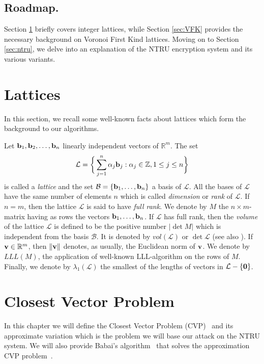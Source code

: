 \documentclass{amsart}
\numberwithin{equation}{section}
\begin{document}
\subsection{Roadmap.}
Section  \ref{sec:lattices} briefly covers integer lattices, while Section \ref{sec:VFK}  provides the necessary background on Voronoi First Kind lattices. Moving on to Section \ref{sec:ntru}, we delve into an explanation of the NTRU encryption system and its various variants.

\section{Lattices}\label{sec:lattices}

In this section, we recall some well-known facts about lattices which form the 
background to our algorithms.

Let ${{\bf{b}}_1,{\bf{b}}_2,\ldots,{\bf{b}}_n}$ linearly independent vectors of 
${\mathbb{R}}^{m}$.
The set 
\[\mathcal{L} = \bigg{\{} \sum_{j=1}^{n}\alpha_j{\bf{b}}_j :
 \alpha_j\in\mathbb{Z}, 1\leq j\leq n\bigg{\}}\]
is called  a {\em lattice} and 
the set $\mathcal{B} = \{{\bf{b}}_1,\ldots,{\bf{b}}_n\}$ a basis of 
$\mathcal{L}$. 
All the bases of $\mathcal{L}$ have the same number of elements $n$ which is  called
 {\em dimension} or {\em rank} of $\mathcal{L}$. If $n=m$, then
the lattice $\mathcal{L}$ is said to have {\em full rank}. 
We denote by $M$ the $n\times m$-matrix  having as rows the vectors 
${\bf{b}}_1,\ldots,{\bf{b}}_n$. 
If $\mathcal{L}$ has full rank, then the {\em volume} of the lattice
 $\mathcal{L}$ is defined to be the positive number
 $|\det{M}|$ which is independent from the basis $\mathcal{B}$. It is denoted 
 by $vol(\mathcal{L})$ or $\det{\mathcal{L}}$ (see also \cite{gal}).
 If ${\bf v}\in \mathbb{R}^m$, then $\|{\bf v}\|$ denotes, as usually, the
 Euclidean norm of ${\bf v}$. 
 We denote by $LLL(M)$, the application of well-known LLL-algorithm on the rows of $M$.
 Finally,   we denote by 
$\lambda_1(\mathcal{L})$ the smallest of the lengths of vectors in 
$ \mathcal{L}-\{ \bf 0\}$.

\section{Closest Vector Problem}\label{sec:CVP}

In this chapter we will define the Closest Vector Problem (CVP)~\cite{gal} and its approximate variation which is the problem we will base our attack on the NTRU system. We will also provide Babai's algorithm~\cite{gal} that solves the approximation CVP problem~\cite{gal}.
\end{document}

